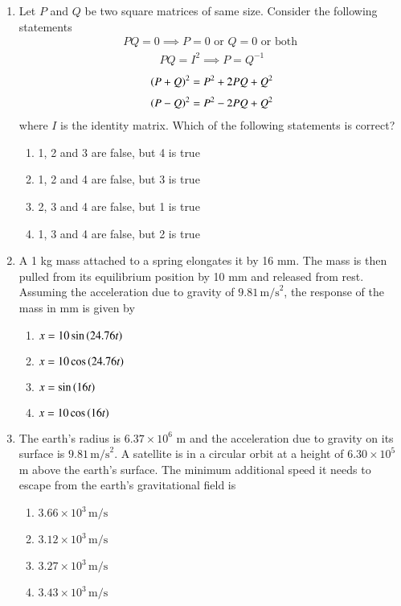 \documentclass[journal]{IEEEtran}
\begin{document}
\begin{enumerate}[start=18]
\item  Let $P$ and $Q$ be two square matrices of same size. Consider the following statements
\begin{align}
    PQ=0  \implies  P=0 \text{ or } Q=0 \text{ or both }
\end{align}
\begin{align}
    PQ=I^2 \implies  P=Q^{-1}
\end{align}
\begin{align}
    {\ensuremath{\left(P+Q\right)}}^2 =P^2+2PQ+Q^2
\end{align}
\begin{align}
     {\ensuremath{\left(P-Q\right)}}^2 =P^2-2PQ+Q^2
\end{align}
where $I$ is the identity matrix. Which of the following statements is correct?
\begin{multicols}{2}
\begin{enumerate}
\item 1, 2 and 3 are false, but 4 is true
\item 1, 2 and 4 are false, but 3 is true
\item 2, 3 and 4 are false, but 1 is true 
\item 1, 3 and 4 are false, but 2 is true
\end{enumerate}
\end{multicols}

\item   A 1 kg mass attached to a spring elongates it by 16 mm. The mass is then pulled from its equilibrium position by 10 mm and released from rest. Assuming the acceleration due to gravity of $9.81 \, \text{m/s}^2$, the response of the mass in mm is given by
\begin{multicols}{2}
\begin{enumerate}
\item $x=10 \sin\left(24.76t\right)$
\item $x=10 \cos\left(24.76t\right)$
\item $x=\sin\left(16t\right)$
\item $x=10\cos\left(16t\right)$
\end{enumerate}
\end{multicols}

\item  The earth's radius is $6.37 \times 10^6$ m and the acceleration due to gravity on its surface is $9.81 \, \text{m/s}^2$. A satellite is in a circular orbit at a height of $6.30 \times 10^5$ m above the earth's surface. The minimum additional speed it needs to escape from the earth's gravitational field is
\begin{multicols}{2}
\begin{enumerate}
\item $3.66 \times 10^3 \, \text{m/s}$
\item $3.12 \times 10^3 \, \text{m/s}$
\item $3.27 \times 10^3 \, \text{m/s}$
\item $3.43 \times 10^3 \, \text{m/s}$
\end{enumerate}
\end{multicols}


\end{enumerate}
\end{document}

